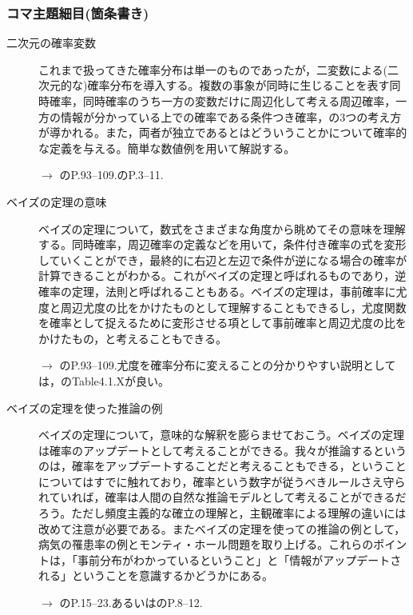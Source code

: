 \subsubsection{コマ主題細目(箇条書き)}
\begin{description}
	\item[二次元の確率変数]これまで扱ってきた確率分布は単一のものであったが，二変数による(二次元的な)確率分布を導入する。複数の事象が同時に生じることを表す同時確率，同時確率のうち一方の変数だけに周辺化して考える周辺確率，一方の情報が分かっている上での確率である条件つき確率，の3つの考え方が導かれる。また，両者が独立であるとはどういうことかについて確率的な定義を与える。簡単な数値例を用いて解説する。
	      \begin{flushright}
		      $\to$ \textcite{Maeda2017}のP.93--109.\textcite{Toyoda201506}のP.3--11.
	      \end{flushright}

	\item[ベイズの定理の意味] ベイズの定理について，数式をさまざまな角度から眺めてその意味を理解する。同時確率，周辺確率の定義などを用いて，条件付き確率の式を変形していくことができ，最終的に右辺と左辺で条件が逆になる場合の確率が計算できることがわかる。これがベイズの定理と呼ばれるものであり，逆確率の定理，法則と呼ばれることもある。ベイズの定理は，事前確率に尤度と周辺尤度の比をかけたものとして理解することもできるし，尤度関数を確率として捉えるために変形させる項として事前確率と周辺尤度の比をかけたもの，と考えることもできる。
	      \begin{flushright}
		      $\to$ \textcite{Maeda2017}のP.93--109.尤度を確率分布に変えることの分かりやすい説明としては，\textcite{Lambert201805}のTable4.1.Xが良い。
	      \end{flushright}

	\item[ベイズの定理を使った推論の例]ベイズの定理について，意味的な解釈を膨らませておこう。ベイズの定理は確率のアップデートとして考えることができる。我々が推論するというのは，確率をアップデートすることだと考えることもできる，ということについてはすでに触れており，確率という数字が従うべきルールさえ守られていれば，確率は人間の自然な推論モデルとして考えることができるだろう。ただし頻度主義的な確立の理解と，主観確率による理解の違いには改めて注意が必要である。またベイズの定理を使っての推論の例として，病気の罹患率の例とモンティ・ホール問題を取り上げる。これらのポイントは，「事前分布がわかっているということ」と「情報がアップデートされる」ということを意識するかどうかにある。
	      \begin{flushright}
		      $\to$ \textcite{Maeda2017}のP.15--23.あるいは\textcite{Toyoda201506}のP.8--12.
	      \end{flushright}

\end{description}
